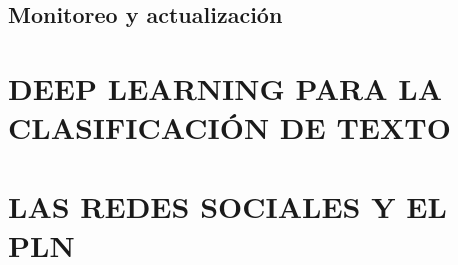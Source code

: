 \subsection{Monitoreo y actualización}

\section{DEEP LEARNING PARA LA CLASIFICACIÓN DE TEXTO}

\section{LAS REDES SOCIALES Y EL PLN}




%
%
%
%
%






